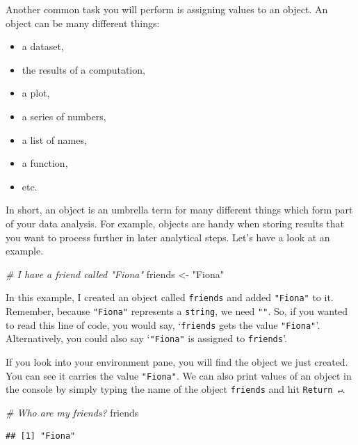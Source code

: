 \documentclass[
]{book}
\newenvironment{Shaded}{\begin{snugshade}}{\end{snugshade}}
\newcommand{\CommentTok}[1]{\textcolor[rgb]{0.56,0.35,0.01}{\textit{#1}}}
\newcommand{\NormalTok}[1]{#1}
\newcommand{\OtherTok}[1]{\textcolor[rgb]{0.56,0.35,0.01}{#1}}
\newcommand{\StringTok}[1]{\textcolor[rgb]{0.31,0.60,0.02}{#1}}
\begin{document}
Another common task you will perform is assigning values to an object. An object can be many different things:

\begin{itemize}
\item
  a dataset,
\item
  the results of a computation,
\item
  a plot,
\item
  a series of numbers,
\item
  a list of names,
\item
  a function,
\item
  etc.
\end{itemize}

In short, an object is an umbrella term for many different things which form part of your data analysis. For example, objects are handy when storing results that you want to process further in later analytical steps. Let's have a look at an example.

\begin{Shaded}
\begin{Highlighting}[]
\CommentTok{\# I have a friend called "Fiona"}
\NormalTok{friends }\OtherTok{\textless{}{-}} \StringTok{"Fiona"}
\end{Highlighting}
\end{Shaded}

In this example, I created an object called \texttt{friends} and added \texttt{"Fiona"} to it. Remember, because \texttt{"Fiona"} represents a \texttt{string}, we need \texttt{""}. So, if you wanted to read this line of code, you would say, `\texttt{friends} gets the value \texttt{"Fiona"}'. Alternatively, you could also say `\texttt{"Fiona"} is assigned to \texttt{friends}'.

If you look into your environment pane, you will find the object we just created. You can see it carries the value \texttt{"Fiona"}. We can also print values of an object in the console by simply typing the name of the object \texttt{friends} and hit \texttt{Return\ ↵}.

\begin{Shaded}
\begin{Highlighting}[]
\CommentTok{\# Who are my friends?}
\NormalTok{friends}
\end{Highlighting}
\end{Shaded}

\begin{verbatim}
## [1] "Fiona"
\end{verbatim}
\end{document}
